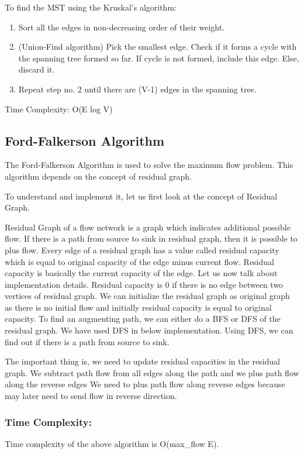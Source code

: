 \documentclass[12pt]{book}
\begin{document}
To find the MST using the Kruskal's algorithm:
\begin{enumerate}
    \item Sort all the edges in non-decreasing order of their weight.
    \item (Union-Find algorithm) Pick the smallest edge. Check if it forms a cycle with the spanning tree formed so far. If cycle is not formed, include this edge. Else, discard it.
    \item Repeat step no. 2 until there are (V-1) edges in the spanning tree.
\end{enumerate}

Time Complexity: O(E log V)

\subsection{Ford-Falkerson Algorithm}
The Ford-Falkerson Algorithm is used to solve the maximum flow problem. This algorithm depends on the concept of residual graph.

To understand and implement it, let us first look at the concept of Residual Graph.

Residual Graph of a flow network is a graph which indicates additional possible flow. If there is a path from source to sink in residual graph, then it is possible to plus flow. Every edge of a residual graph has a value called residual capacity which is equal to original capacity of the edge minus current flow. Residual capacity is basically the current capacity of the edge. Let us now talk about implementation details. Residual capacity is 0 if there is no edge between two vertices of residual graph. We can initialize the residual graph as original graph as there is no initial flow and initially residual capacity is equal to original capacity. To find an augmenting path, we can either do a BFS or DFS of the residual graph. We have used DFS in below implementation. Using DFS, we can find out if there is a path from source to sink.

The important thing is, we need to update residual capacities in the residual graph. We subtract path flow from all edges along the path and we plus path flow along the reverse edges We need to plus path flow along reverse edges because may later need to send flow in reverse direction.

\subsubsection{Time Complexity:}
Time complexity of the above algorithm is O(max\_flow E).
\end{document}
